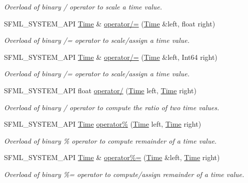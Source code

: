 \begin{DoxyCompactItemize}
\begin{DoxyCompactList}\small\item\em Overload of binary / operator to scale a time value. \end{DoxyCompactList}\item 
S\+F\+M\+L\+\_\+\+S\+Y\+S\+T\+E\+M\+\_\+\+A\+PI \hyperlink{classsf_1_1Time}{Time} \& \hyperlink{classsf_1_1Time_a9835490c54cab06492ec3aa9e9275ef9}{operator/=} (\hyperlink{classsf_1_1Time}{Time} \&left, float right)
\begin{DoxyCompactList}\small\item\em Overload of binary /= operator to scale/assign a time value. \end{DoxyCompactList}\item 
S\+F\+M\+L\+\_\+\+S\+Y\+S\+T\+E\+M\+\_\+\+A\+PI \hyperlink{classsf_1_1Time}{Time} \& \hyperlink{classsf_1_1Time_ad51871e3db77def834ae8688e64504ff}{operator/=} (\hyperlink{classsf_1_1Time}{Time} \&left, Int64 right)
\begin{DoxyCompactList}\small\item\em Overload of binary /= operator to scale/assign a time value. \end{DoxyCompactList}\item 
S\+F\+M\+L\+\_\+\+S\+Y\+S\+T\+E\+M\+\_\+\+A\+PI float \hyperlink{classsf_1_1Time_ac3ae4f4d24a93e088d8e36d68322ea0f}{operator/} (\hyperlink{classsf_1_1Time}{Time} left, \hyperlink{classsf_1_1Time}{Time} right)
\begin{DoxyCompactList}\small\item\em Overload of binary / operator to compute the ratio of two time values. \end{DoxyCompactList}\item 
S\+F\+M\+L\+\_\+\+S\+Y\+S\+T\+E\+M\+\_\+\+A\+PI \hyperlink{classsf_1_1Time}{Time} \hyperlink{classsf_1_1Time_aafb8b12fb0ac0e366d6ea9c9e9f93335}{operator\%} (\hyperlink{classsf_1_1Time}{Time} left, \hyperlink{classsf_1_1Time}{Time} right)
\begin{DoxyCompactList}\small\item\em Overload of binary \% operator to compute remainder of a time value. \end{DoxyCompactList}\item 
S\+F\+M\+L\+\_\+\+S\+Y\+S\+T\+E\+M\+\_\+\+A\+PI \hyperlink{classsf_1_1Time}{Time} \& \hyperlink{classsf_1_1Time_af12dd271f14a17b58c9d737395e776d4}{operator\%=} (\hyperlink{classsf_1_1Time}{Time} \&left, \hyperlink{classsf_1_1Time}{Time} right)
\begin{DoxyCompactList}\small\item\em Overload of binary \%= operator to compute/assign remainder of a time value. \end{DoxyCompactList}\end{DoxyCompactItemize}


